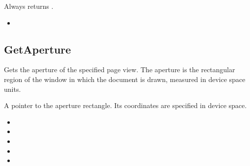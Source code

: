\documentclass[letterpaper,12pt,english,openany,oneside]{sphinxmanual}
\begin{document}

Always returns .

\label{\detokenize{IAC_API_OLE_Objects:related-methods-51}}
\begin{itemize}
\item {} 
 

\end{itemize}




\subsection{GetAperture}
\label{\detokenize{IAC_API_OLE_Objects:getaperture}}
Gets the aperture of the specified page view. The aperture is the rectangular region of the window in which the document is drawn, measured in device space units.


\begin{sphinxVerbatim}[commandchars=\\\{\}]
 
\end{sphinxVerbatim}


A pointer to the aperture rectangle. Its coordinates are specified in device space.

\label{\detokenize{IAC_API_OLE_Objects:related-methods-52}}
\begin{itemize}
\item {} 
 

\item {} 
 

\item {} 
 

\item {} 
 

\item {} 
 

\end{itemize}
\end{document}
